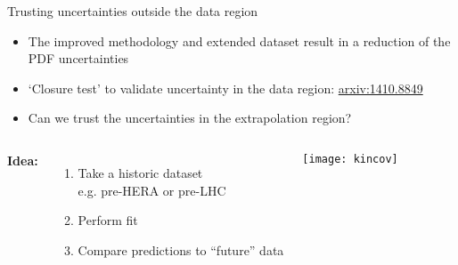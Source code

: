 \begin{frame}{Trusting uncertainties outside the data region}

  \begin{itemize}
          \item The improved methodology and extended dataset result in a reduction of the PDF uncertainties
          \item `Closure test' to validate uncertainty in the data region: \href{https://arxiv.org/abs/1410.8849}{\color{blue} arxiv:1410.8849}
          \item Can we trust the uncertainties in the extrapolation region?
  \end{itemize}
  
  \begin{columns}
      \textbf{Idea:}
      \begin{enumerate}
      \item Take a historic dataset \\ e.g. pre-HERA or pre-LHC
      \item Perform fit
      \item Compare predictions to ``future'' data
      \end{enumerate}
  
        \texttt{[image: kincov]}
  \end{columns}
\end{frame}


